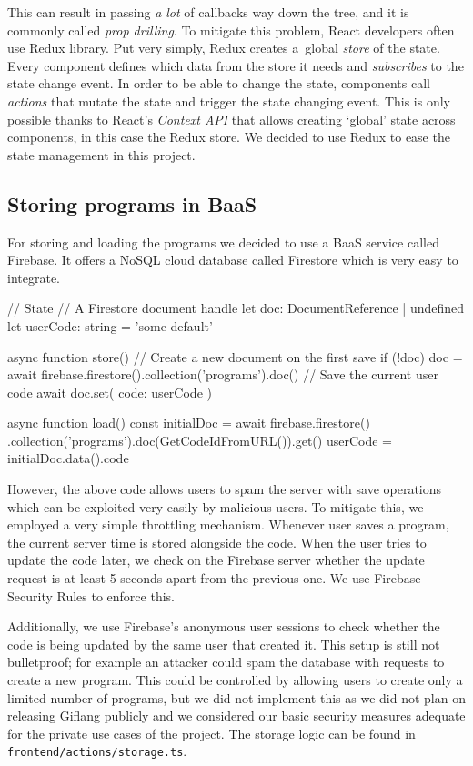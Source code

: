 This can result in passing \emph{a lot} of callbacks way down the tree, and it is commonly called \emph{prop drilling}. To mitigate this problem, React developers
often use Redux library. Put very simply, Redux creates a~global \emph{store} of the state. Every component defines which data from the store it needs and
\emph{subscribes} to the state change event. In order to be able to change the state, components call \emph{actions} that mutate the state and trigger the state
changing event. This is only possible thanks to React's \emph{Context API} that allows creating `global' state across components, in this case the Redux store.
We decided to use Redux to ease the state management in this project.

\subsection{Storing programs in BaaS}
For storing and loading the programs we decided to use a BaaS service called Firebase. It offers a NoSQL cloud database called Firestore which is very easy
to integrate.
\begin{code}
// State
// A Firestore document handle
let doc: DocumentReference | undefined
let userCode: string = 'some default'

async function store() {
    // Create a new document on the first save
    if (!doc) {
        doc = await firebase.firestore().collection('programs').doc()
    }
    // Save the current user code
    await doc.set({ code: userCode })
}

async function load() {
    const initialDoc = 
        await firebase.firestore()
            .collection('programs').doc(GetCodeIdFromURL()).get()
    userCode = initialDoc.data().code
}
\end{code}

However, the above code allows users to spam the server with save operations which can be exploited very easily by malicious users. To mitigate this, we employed a very simple
throttling mechanism. Whenever user saves a program, the current server time is stored alongside the code. When the user tries to update the code later, we check
on the Firebase server whether the update request is at least 5 seconds apart from the previous one. We use Firebase Security Rules to enforce this.

Additionally, we use Firebase's anonymous user sessions to check whether the code is being updated by the same user that created it. This setup is still not
bulletproof; for example an attacker could spam the database with requests to create a new program. This could be controlled by allowing users to create only
a limited number of programs, but we did not implement this as we did not plan on releasing Giflang publicly and we considered our basic security measures
adequate for the private use cases of the project. The storage logic can be found in \texttt{frontend/actions/storage.ts}.